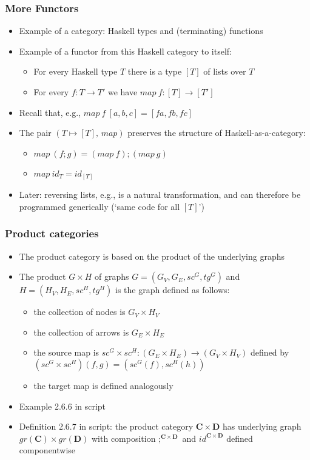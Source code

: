 \documentclass[handout]{beamer}
\newcommand{\bfsf}[1]{{\boldsymbol{#1}}}
\newcommand{\CC}{\bfsf{C}}
\newcommand{\DD}{\bfsf{D}}
\begin{document}
\frame
  {   
    \frametitle{More Functors}\label{Ch2:MoreFunctors}

 \begin{itemize}[<+->]
\item Example of a category: Haskell types and (terminating) functions
\item Example of a functor from this Haskell category to itself:
   \begin{itemize}[<+->]
\item For every Haskell type $T$ there is a type $[T]$ of lists over $T$
\item For every $f: T\to T'$ we have $map~f: [T] \to [T']$
   \end{itemize}
\item Recall that, e.g., $map~f~[a,b,c] = [f  a, f b, fc]$
\item The pair $(T\mapsto[T],\,map)$ preserves the structure of Haskell-as-a-category:
   \begin{itemize}[<+->]
\item $map~(f;g) = (map~f);(map~g)$
\item $map~id_T = id_{[T]}$
   \end{itemize}
\item Later: reversing lists, e.g., is a natural transformation, and can therefore be
programmed generically (`same code for all $[T]$')
 \end{itemize}

 }

\frame
  {   
    \frametitle{Product categories}\label{Ch2:ProdCats}

 \begin{itemize}[<+->]
\item The product category is based on the product of the underlying graphs
\item The product $G\times H$ of graphs $G = (G_V,G_E,sc^G, tg^G)$
and $H = (H_V,H_E,sc^H, tg^H)$ is the graph defined as follows:
   \begin{itemize}[<+->]
\item the collection of nodes is $G_V\times H_V$
\item the collection of arrows is $G_E\times H_E$
\item the source map is $sc^G\times sc^H : (G_E\times H_E)\to (G_V\times H_V)$
defined by $(sc^G\times sc^H)(f,g) = (sc^G(f), sc^H(h))$
\item the target map is defined analogously
   \end{itemize}
\item Example 2.6.6 in script
\item Definition 2.6.7 in script: the product category $\CC\times\DD$ 
has underlying graph $gr(\CC)\times gr(\DD)$ with composition $;^{\CC\times\DD}$
and $id^{\CC\times\DD}$ defined componentwise 
 \end{itemize}

 }
\end{document}
